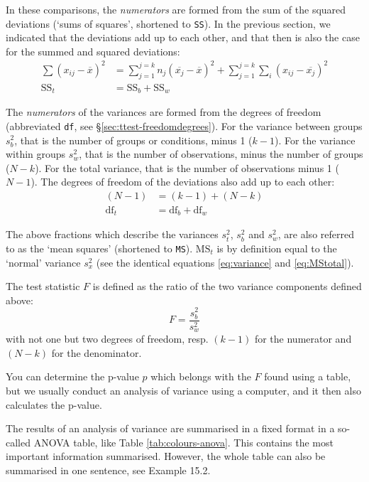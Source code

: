 \documentclass[
]{book}
\begin{document}
In these comparisons, the \emph{numerators} are formed from the sum of
the squared deviations (`sums of squares', shortened to \texttt{SS}). In the
previous section, we indicated that the deviations add up to each other,
and that then is also the case for the summed and squared
deviations:
\begin{align}
  \label{eq:SStotal}
    { \sum (x_{ij} - \overline{x})^2 } &= 
    { \sum_{j=1}^{j=k} n_j (\overline{x_j} - \overline{x})^2 } + 
    { \sum_{j=1}^{j=k} \sum_i (x_{ij} - \overline{x_j})^2 } \\
    \textrm{SS}_t &= \textrm{SS}_b + \textrm{SS}_w
\end{align}

The
\emph{numerators} of the variances are formed from the degrees of freedom
(abbreviated \texttt{df}, see
§\ref{sec:ttest-freedomdegrees}). For the variance between
groups \(s^2_b\), that is the number of groups or conditions, minus 1 (\(k-1\)).
For the variance within groups \(s^2_w\), that is the number of observations,
minus the number of groups (\(N-k\)). For the total variance, that is the
number of observations minus 1 (\(N-1\)). The degrees of freedom of the
deviations also add up to each other:
\begin{align}
  \label{eq:dftotal1}
    { (N-1) } &= { (k-1) } + { (N-k) } \\
    \textrm{df}_t &= \textrm{df}_b + \textrm{df}_w
\end{align}

The above fractions which describe the variances \(s^2_t\), \(s^2_b\) and \(s^2_w\),
are also referred to as the `mean squares' (shortened to \texttt{MS}).
\(\textrm{MS}_{t}\) is by definition equal to the `normal' variance
\(s^2_x\) (see the identical equations
\eqref{eq:variance} and
\eqref{eq:MStotal}).

The test statistic \(F\) is defined as the ratio of the two
variance components defined above:
\begin{equation}
  \label{eq:Fratio}
    F = \frac{ s^2_b } { s^2_w }
\end{equation}
with not one but two
degrees of freedom, resp. \((k-1)\) for the numerator and \((N-k)\) for the denominator.

You can determine the p-value \(p\) which belongs with the
\(F\) found using a table, but we usually conduct an
analysis of variance using a computer, and it then also calculates the
p-value.

The results of an analysis of variance are summarised in a fixed format
in a so-called ANOVA table, like
Table \ref{tab:colours-anova}. This contains the most important
information summarised. However, the whole table can also be summarised in
one sentence, see Example 15.2.
\end{document}
